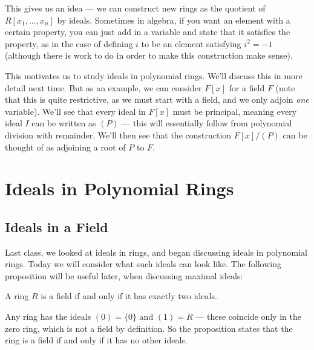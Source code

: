 This gives us an idea --- we can construct new rings as the quotient of $R[x_1, \ldots, x_n]$ by ideals. Sometimes in algebra, if you want an element with a certain property, you can just add in a variable and state that it satisfies the property, as in the case of defining $i$ to be an element satisfying $i^2 = -1$ (although there is work to do in order to make this construction make sense). 

This motivates us to study ideals in polynomial rings. We'll discuss this in more detail next time. But as an example, we can consider $F[x]$ for a field $F$ (note that this is quite restrictive, as we must start with a field, and we only adjoin \emph{one} variable). We'll see that every ideal in $F[x]$ must be principal, meaning every ideal $I$ can be written as $(P)$ --- this will essentially follow from polynomial division with remainder. We'll then see that the construction $F[x]/(P)$ can be thought of as adjoining a root of $P$ to $F$. 




\section{Ideals in Polynomial Rings}

\subsection{Ideals in a Field}

Last class, we looked at ideals in rings, and began discussing ideals in polynomial rings. Today we will consider what such ideals can look like. The following proposition will be useful later, when discussing maximal ideals:

\begin{proposition} \label{field iff two ideals}
    A ring $R$ is a field if and only if it has exactly two ideals. 
\end{proposition}

Any ring has the ideals $(0) = \{0\}$ and $(1) = R$ --- these coincide only in the zero ring, which is not a field by definition. So the proposition states that the ring is a field if and only if it has no other ideals. 

